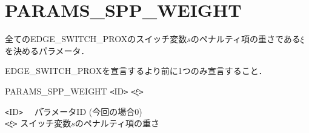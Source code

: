 \documentclass[dvipdfmx]{jsarticle}
\begin{document}
\section{PARAMS\_SPP\_WEIGHT}
全てのEDGE\_SWITCH\_PROXのスイッチ変数$s$のペナルティ項の重さである$\xi$を決めるパラメータ．

EDGE\_SWITCH\_PROXを宣言するより前に1つのみ宣言すること．

PARAMS\_SPP\_WEIGHT \verb|<|ID\verb|>| \verb|<|$\xi$\verb|>|

\begin{tabbing}
	\verb|<|ID\verb|>|　 	\= パラメータID (今回の場合0) \\
	\verb|<|$\xi$\verb|>| 	\> スイッチ変数$s$のペナルティ項の重さ
\end{tabbing}



	
\end{document}
